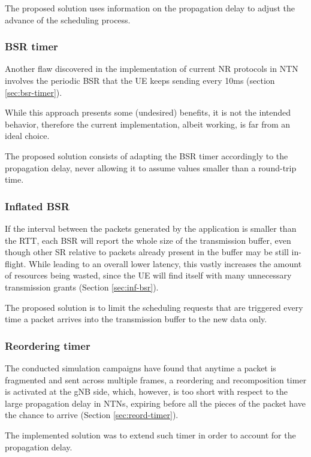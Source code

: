 The proposed solution uses information on the propagation delay to adjust the advance of the scheduling process. 

\subsubsection{BSR timer}

Another flaw discovered in the implementation of current \ac{NR} protocols in \ac{NTN} involves the periodic \ac{BSR} that the \ac{UE} keeps sending every 10ms (section \ref{sec:bsr-timer}). 

While this approach presents some (undesired) benefits, it is not the intended behavior, therefore the current implementation, albeit working, is far from an ideal choice.

The proposed solution consists of adapting the \ac{BSR} timer accordingly to the propagation delay, never allowing it to assume values smaller than a round-trip time. 

\subsubsection{Inflated BSR}
If the interval between the packets generated by the application is smaller than the \ac{RTT}, each \ac{BSR} will report the whole size of the transmission buffer, even though other \ac{SR} relative to packets already present in the buffer may be still in-flight. While leading to an overall lower latency, this vastly increases the amount of resources being wasted, since the \ac{UE} will find itself with many unnecessary transmission grants (Section \ref{sec:inf-bsr}).

The proposed solution is to limit the scheduling requests that are triggered every time a packet arrives into the transmission buffer to the new data only.

\subsubsection{Reordering timer}
The conducted simulation campaigns have found that anytime a packet is fragmented and sent across multiple frames, a reordering and recomposition timer is activated at the \ac{gNB} side, which, however, is too short with respect to the large propagation delay in \ac{NTN}s, expiring before all the pieces of the packet have the chance to arrive (Section \ref{sec:reord-timer}).

The implemented solution was to extend such timer in order to account for the propagation delay.

